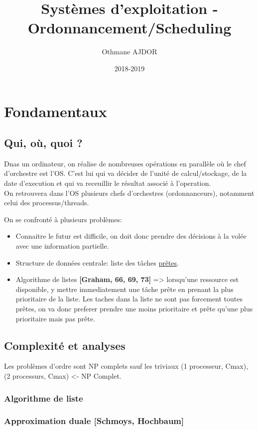 \documentclass[11pt]{article}
\title{Systèmes d'exploitation - Ordonnancement/Scheduling}
\author{Othmane AJDOR}
\date{2018-2019}
\begin{document}
\maketitle

\pagebreak
\tableofcontents
\pagebreak

\section{Fondamentaux}
\subsection{Qui, où, quoi ?}
Dnas un ordinateur, on réalise de nombreuses opérations en parallèle où le chef d'orchestre est l'OS. C'est lui qui va décider de l'unité de calcul/stockage, de la date d'execution et qui va receuillir le résultat associé à l'operation.\\
On retrouvera dans l'OS plusieurs chefs d'orchestres (ordonnanceurs), notamment celui des processus/threads.

On se confronté à plusieurs problèmes:
\begin{itemize}
    \item Connaitre le futur est difficile, on doit donc prendre des décisions à la volée avec une information partielle.
    \item Structure de données centrale: liste des tâches \underline{prêtes}.
    \item Algorithme de listes \textbf{[Graham, 66, 69, 73]} => lorsqu'une ressource est disponible, y mettre immediatement une tâche prête en prenant la plus prioritaire de la liste. Les taches dans la liste ne sont pas forcement toutes prêtes, on va donc preferer prendre une moins prioritaire et prête qu'une plus prioritaire mais pas prête.
\end{itemize}

\subsection{Complexité et analyses}
Les problèmes d'ordre sont NP complets sauf les triviaux (1 processeur, Cmax), (2 processurs, Cmax) <- NP Complet.

\subsubsection{Algorithme de liste}
\subsubsection{Approximation duale [Schmoys, Hochbaum]}
\end{document}

